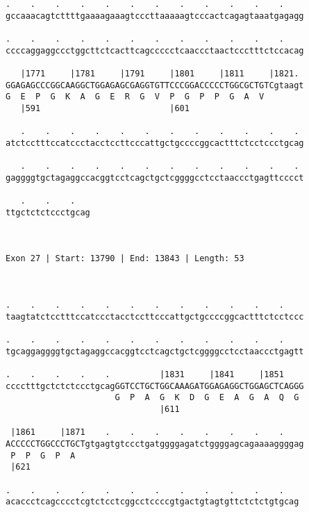 \documentclass{article}
\begin{document}
\begin{Verbatim}
.    .    .    .    .    .    .    .    .    .    .    .    
gccaaacagtcttttgaaaagaaagtcccttaaaaagtcccactcagagtaaatgagagg
                                                            
.    .    .    .    .    .    .    .    .    .    .    .    
ccccaggaggccctggcttctcacttcagccccctcaaccctaactccctttctccacag
                                                            
   |1771     |1781     |1791     |1801     |1811     |1821. 
GGAGAGCCCGGCAAGGCTGGAGAGCGAGGTGTTCCCGGACCCCCTGGCGCTGTCgtaagt
G  E  P  G  K  A  G  E  R  G  V  P  G  P  P  G  A  V        
   |591                          |601                       
  
   .    .    .    .    .    .    .    .    .    .    .    . 
atctcctttccatccctacctccttcccattgctgccccggcactttctcctccctgcag
                                                            
   .    .    .    .    .    .    .    .    .    .    .    . 
gaggggtgctagaggccacggtcctcagctgctcggggcctcctaaccctgagttcccct
                                                            
   .    .    .   
ttgctctctccctgcag
                 
                 
 
Exon 27 | Start: 13790 | End: 13843 | Length: 53



.    .    .    .    .    .    .    .    .    .    .    .    
taagtatctcctttccatccctacctccttcccattgctgccccggcactttctcctccc
                                                            
.    .    .    .    .    .    .    .    .    .    .    .    
tgcaggaggggtgctagaggccacggtcctcagctgctcggggcctcctaaccctgagtt
                                                            
.    .    .    .    .          |1831     |1841     |1851    
cccctttgctctctccctgcagGGTCCTGCTGGCAAAGATGGAGAGGCTGGAGCTCAGGG
                      G  P  A  G  K  D  G  E  A  G  A  Q  G 
                               |611                         
  
 |1861     |1871    .    .    .    .    .    .    .    .    
ACCCCCTGGCCCTGCTgtgagtgtccctgatggggagatctggggagcagaaaaggggag
 P  P  G  P  A                                              
 |621                                                       
  
.    .    .    .    .    .    .    .    .    .    .    .   
acaccctcagcccctcgtctcctcggcctccccgtgactgtagtgttctctctgtgcag
                                                           

\end{Verbatim}
\end{document}
